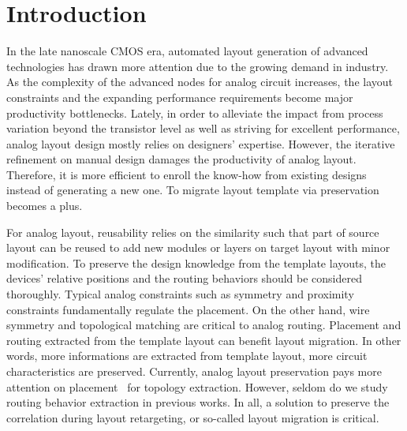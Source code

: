\chapter{Introduction}\label{chap:Intro}

  In the late nanoscale CMOS era, automated layout generation of advanced technologies has drawn more attention due to the growing demand in industry. As the complexity of the advanced nodes for analog circuit increases, the layout constraints and the expanding performance requirements become major productivity bottlenecks. Lately, in order to alleviate the impact from process variation beyond the transistor level as well as striving for excellent performance, analog layout design mostly relies on designers' expertise. However, the iterative refinement on manual design damages the productivity of analog layout. Therefore, it is more efficient to enroll the know-how from existing designs instead of generating a new one. To migrate layout template via preservation becomes a plus.

  For analog layout, reusability relies on the similarity such that part of source layout can be reused to add new modules or layers on target layout with minor modification. To preserve the design knowledge from the template layouts, the devices' relative positions and the routing behaviors should be considered thoroughly. Typical analog constraints such as symmetry and proximity constraints fundamentally regulate the placement. On the other hand, wire symmetry and topological matching are critical to analog routing. Placement and routing extracted from the template layout can benefit layout migration. In other words, more informations are extracted from template layout, more circuit characteristics are preserved. Currently, analog layout preservation pays more attention on placement~\cite{cart-hammouda-dac06,cbc-bhattacharya-dac04,Wang_ALRGP_TODAES2011} 
  for topology extraction. However, seldom do we study routing behavior extraction in previous works. In all, a solution to preserve the correlation during layout retargeting, or so-called layout migration is critical.


